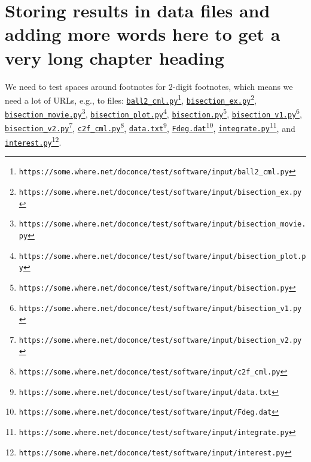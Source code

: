 \documentclass[graybox,sectrefs,envcountresetchap,open=right,final]{svmonodo}
\begin{document}
\noindent
\chapter{Storing results in data files and adding more words here to get a very long chapter heading}

We need to test spaces around footnotes for 2-digit footnotes, which
means we need a lot of URLs, e.g., to files:
\href{{https://some.where.net/doconce/test/software/input/ball2_cml.py}}{\nolinkurl{ball2_cml.py}\footnote{\texttt{https://some.where.net/doconce/test/software/input/ball2\_cml.py}}},
\href{{https://some.where.net/doconce/test/software/input/bisection_ex.py}}{\nolinkurl{bisection_ex.py}\footnote{\texttt{https://some.where.net/doconce/test/software/input/bisection\_ex.py}}},
\href{{https://some.where.net/doconce/test/software/input/bisection_movie.py}}{\nolinkurl{bisection_movie.py}\footnote{\texttt{https://some.where.net/doconce/test/software/input/bisection\_movie.py}}},
\href{{https://some.where.net/doconce/test/software/input/bisection_plot.py}}{\nolinkurl{bisection_plot.py}\footnote{\texttt{https://some.where.net/doconce/test/software/input/bisection\_plot.py}}},
\href{{https://some.where.net/doconce/test/software/input/bisection.py}}{\nolinkurl{bisection.py}\footnote{\texttt{https://some.where.net/doconce/test/software/input/bisection.py}}},
\href{{https://some.where.net/doconce/test/software/input/bisection_v1.py}}{\nolinkurl{bisection_v1.py}\footnote{\texttt{https://some.where.net/doconce/test/software/input/bisection\_v1.py}}},
\href{{https://some.where.net/doconce/test/software/input/bisection_v2.py}}{\nolinkurl{bisection_v2.py}\footnote{\texttt{https://some.where.net/doconce/test/software/input/bisection\_v2.py}}},
\href{{https://some.where.net/doconce/test/software/input/c2f_cml.py}}{\nolinkurl{c2f_cml.py}\footnote{\texttt{https://some.where.net/doconce/test/software/input/c2f\_cml.py}}},
\href{{https://some.where.net/doconce/test/software/input/data.txt}}{\nolinkurl{data.txt}\footnote{\texttt{https://some.where.net/doconce/test/software/input/data.txt}}},
\href{{https://some.where.net/doconce/test/software/input/Fdeg.dat}}{\nolinkurl{Fdeg.dat}\footnote{\texttt{https://some.where.net/doconce/test/software/input/Fdeg.dat}}},
\href{{https://some.where.net/doconce/test/software/input/integrate.py}}{\nolinkurl{integrate.py}\footnote{\texttt{https://some.where.net/doconce/test/software/input/integrate.py}}}, and
\href{{https://some.where.net/doconce/test/software/input/interest.py}}{\nolinkurl{interest.py}\footnote{\texttt{https://some.where.net/doconce/test/software/input/interest.py}}}.
\end{document}

